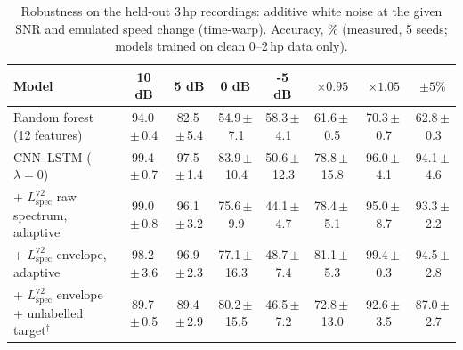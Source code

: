 \begin{table}[t]
\caption{Robustness on the held-out 3\,hp recordings: additive white noise at the given SNR and emulated speed change (time-warp). Accuracy, \% (measured, 5 seeds; models trained on clean 0--2\,hp data only).}
\label{tab:robust}
\centering
\footnotesize
\begin{tabular}{lccccccc}
\toprule
Model & 10 dB & 5 dB & 0 dB & -5 dB & $\times0.95$ & $\times1.05$ & $\pm5\%$ \\
\midrule
Random forest (12 features) & 94.0\,$\pm$\,0.4 & 82.5\,$\pm$\,5.4 & 54.9\,$\pm$\,7.1 & 58.3\,$\pm$\,4.1 & 61.6\,$\pm$\,0.5 & 70.3\,$\pm$\,0.7 & 62.8\,$\pm$\,0.3 \\
CNN--LSTM ($\lambda=0$) & 99.4\,$\pm$\,0.7 & 97.5\,$\pm$\,1.4 & 83.9\,$\pm$\,10.4 & 50.6\,$\pm$\,12.3 & 78.8\,$\pm$\,15.8 & 96.0\,$\pm$\,4.1 & 94.1\,$\pm$\,4.6 \\
+ $L_{\mathrm{spec}}^{\mathrm{v2}}$ raw spectrum, adaptive & 99.0\,$\pm$\,0.8 & 96.1\,$\pm$\,3.2 & 75.6\,$\pm$\,9.9 & 44.1\,$\pm$\,4.7 & 78.4\,$\pm$\,5.1 & 95.0\,$\pm$\,8.7 & 93.3\,$\pm$\,2.2 \\
+ $L_{\mathrm{spec}}^{\mathrm{v2}}$ envelope, adaptive & 98.2\,$\pm$\,3.6 & 96.9\,$\pm$\,2.3 & 77.1\,$\pm$\,16.3 & 48.7\,$\pm$\,7.4 & 81.1\,$\pm$\,5.3 & 99.4\,$\pm$\,0.3 & 94.5\,$\pm$\,2.8 \\
+ $L_{\mathrm{spec}}^{\mathrm{v2}}$ envelope + unlabelled target$^{\dagger}$ & 89.7\,$\pm$\,0.5 & 89.4\,$\pm$\,2.9 & 80.2\,$\pm$\,15.5 & 46.5\,$\pm$\,7.2 & 72.8\,$\pm$\,13.0 & 92.6\,$\pm$\,3.5 & 87.0\,$\pm$\,2.7 \\
\bottomrule
\end{tabular}
\end{table}
